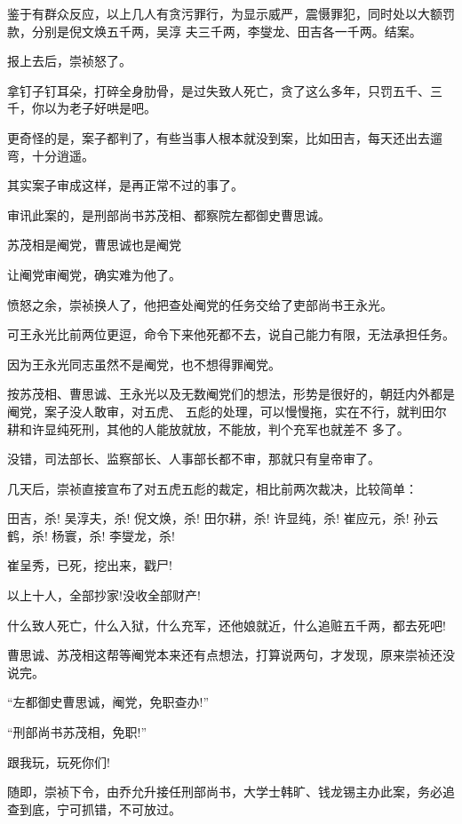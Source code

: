 \documentclass[11pt,a4paper,onecolumn]{article}
\begin{document}
鉴于有群众反应，以上几人有贪污罪行，为显示威严，震慑罪犯，同时处以大额罚款，分别是倪文焕五千两，吴淳
夫三千两，李燮龙、田吉各一千两。结案。

报上去后，崇祯怒了。

拿钉子钉耳朵，打碎全身肋骨，是过失致人死亡，贪了这么多年，只罚五千、三千，你以为老子好哄是吧。

更奇怪的是，案子都判了，有些当事人根本就没到案，比如田吉，每天还出去遛弯，十分逍遥。

其实案子审成这样，是再正常不过的事了。

审讯此案的，是刑部尚书苏茂相、都察院左都御史曹思诚。

苏茂相是阉党，曹思诚也是阉党

让阉党审阉党，确实难为他了。

愤怒之余，崇祯换人了，他把查处阉党的任务交给了吏部尚书王永光。

可王永光比前两位更逗，命令下来他死都不去，说自己能力有限，无法承担任务。

因为王永光同志虽然不是阉党，也不想得罪阉党。

按苏茂相、曹思诚、王永光以及无数阉党们的想法，形势是很好的，朝廷内外都是阉党，案子没人敢审，对五虎、
五彪的处理，可以慢慢拖，实在不行，就判田尔耕和许显纯死刑，其他的人能放就放，不能放，判个充军也就差不
多了。

没错，司法部长、监察部长、人事部长都不审，那就只有皇帝审了。

几天后，崇祯直接宣布了对五虎五彪的裁定，相比前两次裁决，比较简单：

田吉，杀! 吴淳夫，杀! 倪文焕，杀! 田尔耕，杀! 许显纯，杀! 崔应元，杀! 孙云鹤，杀! 杨寰，杀! 李燮龙，杀!

崔呈秀，已死，挖出来，戳尸!

以上十人，全部抄家!没收全部财产!

什么致人死亡，什么入狱，什么充军，还他娘就近，什么追赃五千两，都去死吧!

曹思诚、苏茂相这帮等阉党本来还有点想法，打算说两句，才发现，原来崇祯还没说完。

``左都御史曹思诚，阉党，免职查办!''

``刑部尚书苏茂相，免职!''

跟我玩，玩死你们!

随即，崇祯下令，由乔允升接任刑部尚书，大学士韩旷、钱龙锡主办此案，务必追查到底，宁可抓错，不可放过。

\section[\thesection]{}
\end{document}

